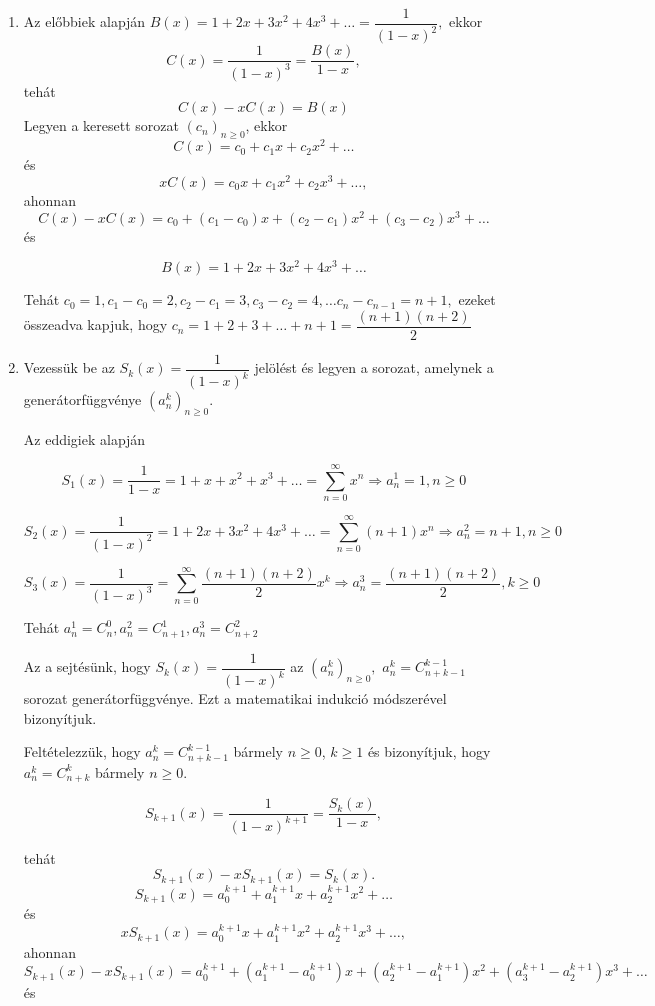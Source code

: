 \begin{solution}
\begin{enumerate}
\item Az előbbiek alapján $B(x)=1+2x+3x^{2}+4x^{3}+\dots=\dfrac{1}{(1-x)^{2}},$
ekkor 
\[
C(x)=\dfrac{1}{(1-x)^{3}}=\dfrac{B(x)}{1-x},
\]
tehát 
\[
C(x)-xC(x)=B(x)
\]
Legyen a keresett sorozat $\left(c_{n}\right)_{n\geq0}$, ekkor 
\[
C(x)=c_{0}+c_{1}x+c_{2}x^{2}+\dots
\]
és 
\[
xC(x)=c_{0}x+c_{1}x^{2}+c_{2}x^{3}+\dots,
\]
ahonnan 
\[
C(x)-xC(x)=c_{0}+(c_{1}-c_{0})x+(c_{2}-c_{1})x^{2}+(c_{3}-c_{2})x^{3}+\dots
\]
és

\[
B(x)=1+2x+3x^{2}+4x^{3}+\dots
\]

Tehát $c_{0}=1,c_{1}-c_{0}=2,c_{2}-c_{1}=3,c_{3}-c_{2}=4,\dots c_{n}-c_{n-1}=n+1,$
ezeket összeadva kapjuk, hogy $c_{n}=1+2+3+\dots+n+1=\dfrac{(n+1)(n+2)}{2}$
\item Vezessük be az $S_{k}(x)=\dfrac{1}{(1-x)^{k}}$ jelölést és legyen
a sorozat, amelynek a generátorfüggvénye $\left(a_{n}^{k}\right)_{n\geq0}.$

Az eddigiek alapján

\[
S_{1}(x)=\dfrac{1}{1-x}=1+x+x^{2}+x^{3}+\dots=\sum_{n=0}^{\infty}x^{n}\Rightarrow a_{n}^{1}=1,n\geq0
\]

\[
S_{2}(x)=\dfrac{1}{(1-x)^{2}}=1+2x+3x^{2}+4x^{3}+\dots=\sum_{n=0}^{\infty}(n+1)x^{n}\Rightarrow a_{n}^{2}=n+1,n\geq0
\]

\[
S_{3}(x)=\dfrac{1}{(1-x)^{3}}=\sum_{n=0}^{\infty}\dfrac{(n+1)(n+2)}{2}x^{k}\Rightarrow a_{n}^{3}=\dfrac{(n+1)(n+2)}{2},k\geq0
\]

Tehát $a_{n}^{1}=C_{n}^{0},a_{n}^{2}=C_{n+1}^{1},a_{n}^{3}=C_{n+2}^{2}$

Az a sejtésünk, hogy $S_{k}(x)=\dfrac{1}{(1-x)^{k}}$ az $\left(a_{n}^{k}\right)_{n\geq0},$
$a_{n}^{k}=C_{n+k-1}^{k-1}$ sorozat generátorfüggvénye. Ezt a matematikai
indukció módszerével bizonyítjuk.

Feltételezzük, hogy $a_{n}^{k}=C_{n+k-1}^{k-1}$ bármely $n\geq0$,
$k\geq1$ és bizonyítjuk, hogy $a_{n}^{k}=C_{n+k}^{k}$ bármely $n\geq0$.

\[
S_{k+1}(x)=\dfrac{1}{(1-x)^{k+1}}=\dfrac{S_{k}(x)}{1-x},
\]

tehát 
\[
S_{k+1}(x)-xS_{k+1}(x)=S_{k}(x).
\]
\[
S_{k+1}(x)=a_{0}^{k+1}+a_{1}^{k+1}x+a_{2}^{k+1}x^{2}+\dots
\]
és 
\[
xS_{k+1}(x)=a_{0}^{k+1}x+a_{1}^{k+1}x^{2}+a_{2}^{k+1}x^{3}+\dots,
\]
ahonnan 
\[
S_{k+1}(x)-xS_{k+1}(x)=a_{0}^{k+1}+(a_{1}^{k+1}-a_{0}^{k+1})x+(a_{2}^{k+1}-a_{1}^{k+1})x^{2}+(a_{3}^{k+1}-a_{2}^{k+1})x^{3}+\dots
\]
és


\end{enumerate}
\end{solution}
